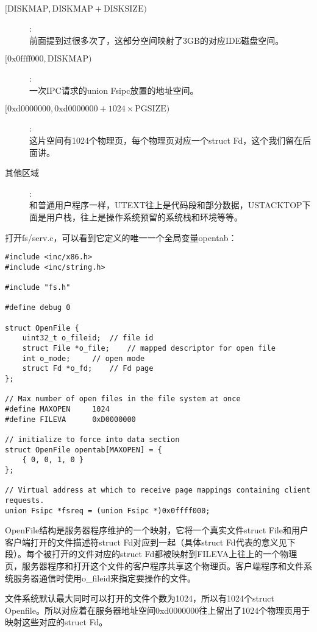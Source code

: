 \documentclass{article}
\begin{document}
\begin{CJK*}{UTF8}{gkai}
\begin{description}
\item[$[\mathrm{DISKMAP}, \mathrm{DISKMAP} + \mathrm{DISKSIZE})$]: \\
前面提到过很多次了，这部分空间映射了3GB的对应IDE磁盘空间。
\item[$[\mathrm{0x0ffff000}, \mathrm{DISKMAP})$]: \\
一次IPC请求的union Fsipc放置的地址空间。
\item[$[\mathrm{0xd0000000}, \mathrm{0xd0000000} + 1024 \times \mathrm{PGSIZE})$]: \\
这片空间有1024个物理页，每个物理页对应一个struct Fd，这个我们留在后面讲。
\item[其他区域]:\\
和普通用户程序一样，UTEXT往上是代码段和部分数据，USTACKTOP下面是用户栈，往上是操作系统预留的系统栈和环境等等。
\end{description}

打开fs/serv.c，可以看到它定义的唯一一个全局变量opentab：

\begin{lstlisting}[style=ccode, title={\scriptsize \ttfamily \bfseries fs/serv.c}]
#include <inc/x86.h>
#include <inc/string.h>

#include "fs.h"

#define debug 0

struct OpenFile {
	uint32_t o_fileid;	// file id
	struct File *o_file;	// mapped descriptor for open file
	int o_mode;		// open mode
	struct Fd *o_fd;	// Fd page
};

// Max number of open files in the file system at once
#define MAXOPEN		1024
#define FILEVA		0xD0000000

// initialize to force into data section
struct OpenFile opentab[MAXOPEN] = {
	{ 0, 0, 1, 0 }
};

// Virtual address at which to receive page mappings containing client requests.
union Fsipc *fsreq = (union Fsipc *)0x0ffff000;
\end{lstlisting}


OpenFile结构是服务器程序维护的一个映射，它将一个真实文件struct File和用户客户端打开的文件描述符struct Fd对应到一起（具体struct Fd代表的意义见下段）。每个被打开的文件对应的struct Fd都被映射到FILEVA上往上的一个物理页，服务器程序和打开这个文件的客户程序共享这个物理页。客户端程序和文件系统服务器通信时使用o\_fileid来指定要操作的文件。

文件系统默认最大同时可以打开的文件个数为1024，所以有1024个struct Openfile。所以对应着在服务器地址空间0xd0000000往上留出了1024个物理页用于映射这些对应的struct Fd。



\end{CJK*}
\end{document}
